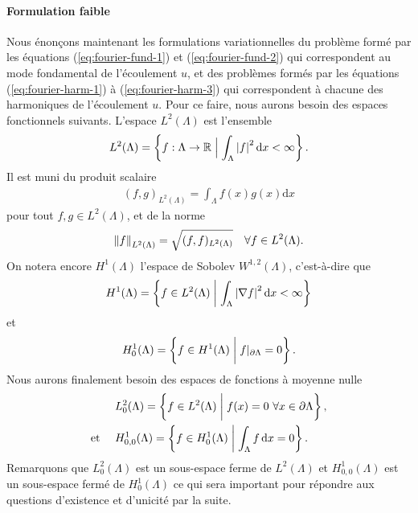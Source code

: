 \paragraph{Formulation faible}\label{sec:stokes-fourier-weak}
Nous énonçons maintenant les formulations variationnelles du problème
formé par les équations (\ref{eq:fourier-fund-1}) et
(\ref{eq:fourier-fund-2}) qui correspondent au mode fondamental de
l'écoulement $u$, et des problèmes formés par les équations
(\ref{eq:fourier-harm-1}) à (\ref{eq:fourier-harm-3}) qui
correspondent à chacune des harmoniques de l'écoulement $u$. Pour ce
faire, nous aurons besoin des espaces fonctionnels suivants. L'espace
$L^2(\Lambda)$ est l'ensemble
\begin{align}
  L^2(\Lambda) = \left\{ f:\Lambda\to\mathbb R \mathrel{\Big|} \int_\Lambda
    \left\lvert f \right\rvert^2\mathrm dx < \infty \right\}.
\end{align}
Il est muni du produit scalaire
\begin{align}
  (f, g)_{L^2(\Lambda)} = \int_\Lambda f(x)g(x)\mathrm dx
\end{align}
pour tout $f, g\in L^2(\Lambda)$, et de la norme
\begin{align}
  \left\lVert f \right\rVert_{L^2(\Lambda)} = \sqrt{(f, f)_{L^2(\Lambda)}}\quad\forall f\in L^2(\Lambda).
\end{align}
On notera encore $H^1(\Lambda)$ l'espace de Sobolev
$W^{1,2}(\Lambda)$, c'est-à-dire que
\begin{align}
  H^1(\Lambda) = \left\{ f\in L^2(\Lambda)\mathrel{\bigg|} \int_\Lambda
    \left\lvert \nabla f \right\rvert^2 \mathrm dx < \infty \right\}
\end{align}
et
\begin{align}
  H^1_0(\Lambda) = \left\{ f \in H^1(\Lambda) \mathrel{\bigg|}
    f|_{\partial \Lambda} = 0 \right\}.
\end{align}
Nous aurons finalement besoin des espaces de fonctions à moyenne nulle
\begin{align}
  &L^2_0(\Lambda) = \left\{ f\in L^2(\Lambda)\mathrel{\bigg|} f(x) = 0\ \forall
    x\in \partial\Lambda \right\},\\
  \text{et }\quad &H^1_{0,0}(\Lambda) = \left\{ f\in H^1_0(\Lambda)\mathrel{\bigg|}
    \int_\Lambda f \,\mathrm dx = 0 \right\}.
\end{align}
Remarquons que $L^2_0(\Lambda)$ est un sous-espace ferme de
$L^2(\Lambda)$ et $H^1_{0,0}(\Lambda)$ est un sous-espace fermé de
$H^1_0(\Lambda)$ ce qui sera important pour répondre aux questions
d'existence et d'unicité par la suite.

